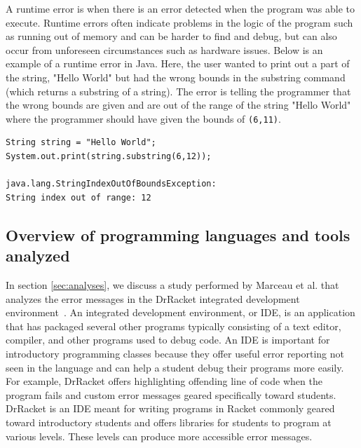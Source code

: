 \documentclass{sig-alternate}
\begin{document}
A runtime error is when there is an error detected when the program was able to execute.
Runtime errors often indicate problems in the logic of the program such as running out of memory and can be harder to find and debug, but can also occur from unforeseen circumstances such as hardware issues.
Below is an example of a runtime error in Java.
Here, the user wanted to print out a part of the string, "Hello World" but had the wrong bounds in the substring command (which returns a substring of a string).
The error is telling the programmer that the wrong bounds are given and are out of the range of the string "Hello World" where the programmer should have given the bounds of \texttt{(6,11)}.

\begin{verbatim}
String string = "Hello World";
System.out.print(string.substring(6,12));

java.lang.StringIndexOutOfBoundsException:
String index out of range: 12
\end{verbatim}

\subsection{Overview of programming languages and tools analyzed}\label{subsec:languages}

In section \ref{sec:analyses}, we discuss a study performed by Marceau et al. that analyzes the error messages in the DrRacket integrated development environment~\cite{Marceau:2011:MEE:1953163.1953308}.
An integrated development environment, or IDE, is an application that has packaged several other programs typically consisting of a text editor, compiler, and other programs used to debug code.
An IDE is important for introductory programming classes because they offer useful error reporting not seen in the language and can help a student debug their programs more easily.
For example, DrRacket offers highlighting offending line of code when the program fails and custom error messages geared specifically toward students.
DrRacket is an IDE meant for writing programs in Racket commonly geared toward introductory students and offers libraries for students to program at various levels.
These levels can produce more accessible error messages.
\end{document}
